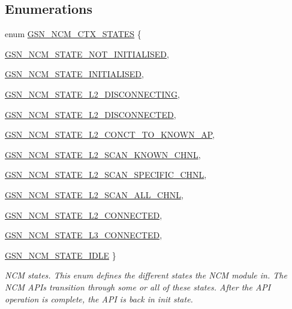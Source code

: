 \subsection*{Enumerations}
\begin{DoxyCompactItemize}
\item 
enum \hyperlink{a00688_ga950af3c458482d4fbf1838aaf8b30f2d}{GSN\_\-NCM\_\-CTX\_\-STATES} \{ \par
\hyperlink{a00688_gga950af3c458482d4fbf1838aaf8b30f2da3e09b1bfa5ac8ce7a8e65138193e1ecb}{GSN\_\-NCM\_\-STATE\_\-NOT\_\-INITIALISED}, 
\par
\hyperlink{a00688_gga950af3c458482d4fbf1838aaf8b30f2da830ff14e14067fef8cbf42cead8a871a}{GSN\_\-NCM\_\-STATE\_\-INITIALISED}, 
\par
\hyperlink{a00688_gga950af3c458482d4fbf1838aaf8b30f2da8c30b49c08e6991f83a9b8c208fd8bd5}{GSN\_\-NCM\_\-STATE\_\-L2\_\-DISCONNECTING}, 
\par
\hyperlink{a00688_gga950af3c458482d4fbf1838aaf8b30f2da7f3541fe96901cd0e93d2644233482f9}{GSN\_\-NCM\_\-STATE\_\-L2\_\-DISCONNECTED}, 
\par
\hyperlink{a00688_gga950af3c458482d4fbf1838aaf8b30f2da39d1f07a068d2c5462c72c33b7b76259}{GSN\_\-NCM\_\-STATE\_\-L2\_\-CONCT\_\-TO\_\-KNOWN\_\-AP}, 
\par
\hyperlink{a00688_gga950af3c458482d4fbf1838aaf8b30f2dabd8e860d56fd77b264d1db7c518a6f77}{GSN\_\-NCM\_\-STATE\_\-L2\_\-SCAN\_\-KNOWN\_\-CHNL}, 
\par
\hyperlink{a00688_gga950af3c458482d4fbf1838aaf8b30f2da7cb3a6d76e63569079a9ea3adbc7eaef}{GSN\_\-NCM\_\-STATE\_\-L2\_\-SCAN\_\-SPECIFIC\_\-CHNL}, 
\par
\hyperlink{a00688_gga950af3c458482d4fbf1838aaf8b30f2daa3532bd5ed61d5a5535078d948b1022d}{GSN\_\-NCM\_\-STATE\_\-L2\_\-SCAN\_\-ALL\_\-CHNL}, 
\par
\hyperlink{a00688_gga950af3c458482d4fbf1838aaf8b30f2daf9087e99e508fd754ef4e32ca8ab4b3b}{GSN\_\-NCM\_\-STATE\_\-L2\_\-CONNECTED}, 
\par
\hyperlink{a00688_gga950af3c458482d4fbf1838aaf8b30f2da66eb72fa85fe1d23963fe8daa49d9215}{GSN\_\-NCM\_\-STATE\_\-L3\_\-CONNECTED}, 
\par
\hyperlink{a00688_gga950af3c458482d4fbf1838aaf8b30f2daed4f9e1b80afb22d823328667e4b8e02}{GSN\_\-NCM\_\-STATE\_\-IDLE}
 \}
\begin{DoxyCompactList}\small\item\em NCM states. This enum defines the different states the NCM module in. The NCM APIs transition through some or all of these states. After the API operation is complete, the API is back in init state. \end{DoxyCompactList}\item 

\end{DoxyCompactItemize}
